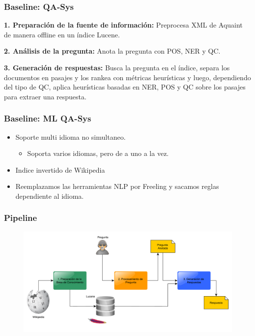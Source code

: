 \begin{frame}
\frametitle{Baseline: QA-Sys}
  \textbf{1. Preparación de la fuente de información: } Preprocesa XML de Aquaint de manera offline en un índice Lucene. \newline

\textbf{2. Análisis de la pregunta: } \newline Anota la pregunta con POS, NER y QC. \newline

\textbf{3. Generación de respuestas: } Busca la pregunta en el índice, separa los documentos en pasajes y los rankea con métricas heurísticas y luego, dependiendo del tipo de QC, aplica heurísticas basadas en NER, POS y QC sobre los pasajes para extraer una respuesta.\newline

\end{frame}

\begin{frame}
\frametitle{Baseline: ML QA-Sys}
  \begin{itemize}
    \item Soporte multi idioma no simultaneo.
    \begin{itemize}
      \item Soporta varios idiomas, pero de a uno a la vez.
    \end{itemize}
    \item Indice invertido de Wikipedia
    \item Reemplazamos las herramientas NLP por Freeling y sacamos reglas dependiente al idioma.
  \end{itemize}
\end{frame}


\begin{frame}
\frametitle{Pipeline}
  \begin{figure}
      \includegraphics[scale=0.3]{graficos/pipeline}
  \end{figure}
\end{frame}


